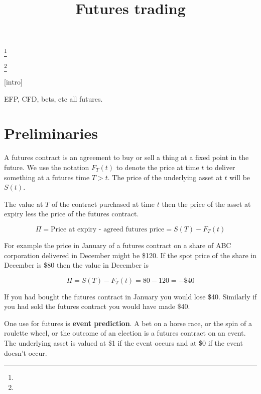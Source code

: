 \documentclass{tran-l}
\theoremstyle{definition}
\theoremstyle{remark}
\numberwithin{equation}{subsection}
\begin{document}
\title[]
{Futures trading}

\author{}

\address{}

\email{}

\thanks{}

\thanks{}

\subjclass{}

\keywords{}

\date{}

\dedicatory{}

\commby{}



\maketitle


[intro]

EFP, CFD, bets, etc all futures.

\section{Preliminaries}

A futures contract is an agreement to buy or sell a thing at a fixed point in the future. We use the notation $F_T(t)$ to denote the price at time $t$ to deliver something at a futures time $T>t$. The price of the underlying asset at $t$ will be $S(t)$.

The value at $T$ of the contract purchased at time $t$ then the price of the asset at expiry less the price of the futures contract.

\[ \Pi = \mbox{Price at expiry - agreed futures price}  = S(T)-F_T(t) \]

For example the price in January of a futures contract on a share of ABC corporation delivered in December might be \$120. If the spot price of the share in December is \$80 then the value in December is 

\[\Pi =  S(T) - F_T(t)  = 80 - 120 = -\$40 \]

If you had bought the futures contract in January you would lose \$40. Similarly if you had sold the futures contract you would have made \$40.

One use for futures is \textbf{event prediction}. A bet on a horse race, or the spin of a roulette wheel, or the outcome of an election is  a futures contract on an event. The underlying asset  is valued at \$1 if the event occurs and at \$0 if the event doesn't occur. 
\end{document}

